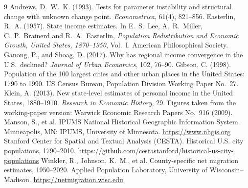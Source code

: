 \documentclass[11pt]{article}
\begin{document}
\begin{thebibliography}{9}\small
{}
Andrews, D.~W.~K. (1993). Tests for parameter instability and structural change with unknown change
point. \emph{Econometrica}, 61(4), 821--856.
Easterlin, R.~A. (1957). State income estimates. In E.~S.~Lee, A.~R.~Miller, C.~P.~Brainerd and
R.~A.~Easterlin, \emph{Population Redistribution and Economic Growth, United States, 1870--1950},
Vol.~I. American Philosophical Society.
Ganong, P., and Shoag, D. (2017). Why has regional income convergence in the U.S.\ declined?
\emph{Journal of Urban Economics}, 102, 76--90.
Gibson, C. (1998). Population of the 100 largest cities and other urban places in the United
States: 1790 to 1990. US Census Bureau, Population Division Working Paper No.~27.
Klein, A. (2013). New state-level estimates of personal income in the United States, 1880--1910.
\emph{Research in Economic History}, 29. Figures taken from the working-paper version: Warwick
Economic Research Papers No.~916 (2009).
Manson, S., et al. IPUMS National Historical Geographic Information System. Minneapolis, MN:
IPUMS, University of Minnesota. \url{https://www.nhgis.org}
Stanford Center for Spatial and Textual Analysis (CESTA). Historical U.S. city populations,
1790--2010. \url{https://github.com/cestastanford/historical-us-city-populations}
Winkler, R., Johnson, K.~M., et al. County-specific net migration estimates, 1950--2020. Applied
Population Laboratory, University of Wisconsin--Madison. \url{https://netmigration.wisc.edu}
\end{thebibliography}
\end{document}
